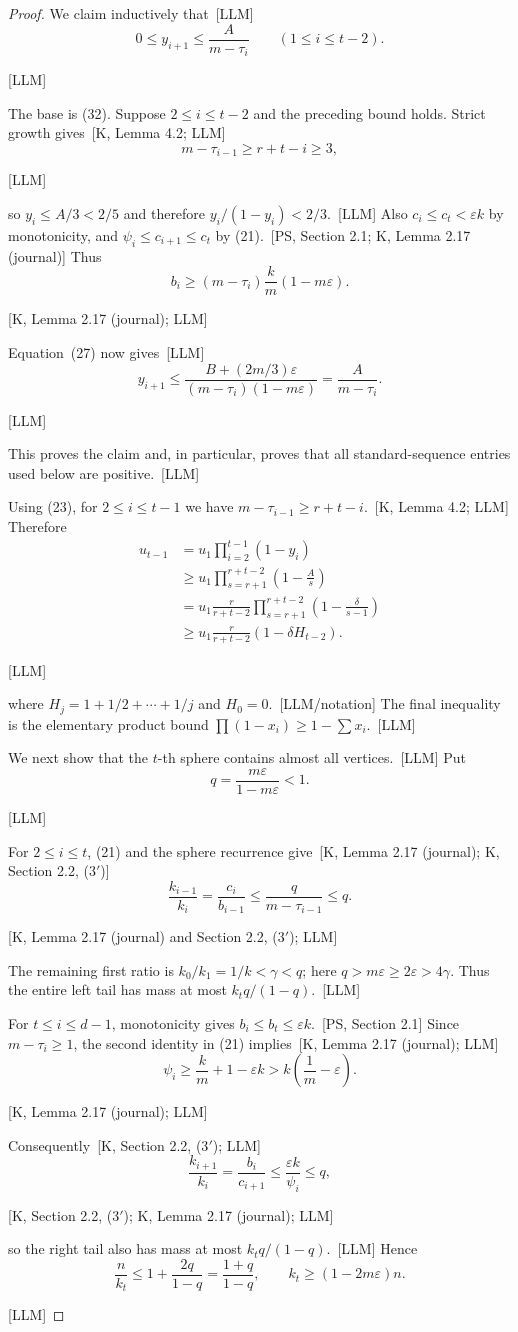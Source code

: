 \documentclass[10pt]{amsart}
\theoremstyle{remark}
\newcommand{\eps}{\varepsilon}
\newcommand{\prov}[1]{\unskip\, {\normalfont\scriptsize\color{provgray}\textsf{[#1]}}}
\newcommand{\eqprov}[1]{%
  \par\nobreak\vspace{-0.68\baselineskip}%
  \noindent\hfill{\normalfont\scriptsize\color{provgray}\textsf{[#1]}}%
  \par\vspace{0.20\baselineskip}%
}
\begin{document}
\begin{proof}
We claim inductively that\prov{LLM}
\begin{equation}
0\le y_{i+1}\le\frac{A}{m-\tau_i}
\qquad(1\le i\le t-2).
\end{equation}
\eqprov{LLM}
The base is (32). Suppose $2\le i\le t-2$ and the preceding bound holds. Strict growth gives\prov{K, Lemma 4.2; LLM}
\[
m-\tau_{i-1}\ge r+t-i\ge3,
\]
\eqprov{LLM}
so $y_i\le A/3<2/5$ and therefore $y_i/(1-y_i)<2/3$.\prov{LLM} Also $c_i\le c_t<\eps k$ by monotonicity, and $\psi_i\le c_{i+1}\le c_t$ by (21).\prov{PS, Section 2.1; K, Lemma 2.17 (journal)} Thus
\[
b_i\ge(m-\tau_i)\frac{k}{m}(1-m\eps).
\]
\eqprov{K, Lemma 2.17 (journal); LLM}
Equation~(27) now gives\prov{LLM}
\[
y_{i+1}\le\frac{B+(2m/3)\eps}{(m-\tau_i)(1-m\eps)}
=\frac{A}{m-\tau_i}.
\]
\eqprov{LLM}
This proves the claim and, in particular, proves that all standard-sequence entries used below are positive.\prov{LLM}

Using (23), for $2\le i\le t-1$ we have $m-\tau_{i-1}\ge r+t-i$.\prov{K, Lemma 4.2; LLM} Therefore
\begin{equation}
\begin{aligned}
u_{t-1}
&=u_1\prod_{i=2}^{t-1}(1-y_i)\\
&\ge u_1\prod_{s=r+1}^{r+t-2}\left(1-\frac{A}{s}\right)\\
&=u_1\frac{r}{r+t-2}\prod_{s=r+1}^{r+t-2}\left(1-\frac{\delta}{s-1}\right)\\
&\ge u_1\frac{r}{r+t-2}(1-\delta H_{t-2}).
\end{aligned}
\end{equation}
\eqprov{LLM}
where $H_j=1+1/2+\cdots+1/j$ and $H_0=0$.\prov{LLM/notation} The final inequality is the elementary product bound $\prod(1-x_i)\ge1-\sum x_i$.\prov{LLM}

We next show that the $t$-th sphere contains almost all vertices.\prov{LLM} Put
\begin{equation}
q=\frac{m\eps}{1-m\eps}<1.
\end{equation}
\eqprov{LLM}
For $2\le i\le t$, (21) and the sphere recurrence give\prov{K, Lemma 2.17 (journal); K, Section 2.2, (3\(\prime\))}
\[
\frac{k_{i-1}}{k_i}=\frac{c_i}{b_{i-1}}
\le\frac{q}{m-\tau_{i-1}}\le q.
\]
\eqprov{K, Lemma 2.17 (journal) and Section 2.2, (3\(\prime\)); LLM}
The remaining first ratio is $k_0/k_1=1/k<\gamma<q$; here $q>m\eps\ge2\eps>4\gamma$. Thus the entire left tail has mass at most $k_tq/(1-q)$.\prov{LLM}

For $t\le i\le d-1$, monotonicity gives $b_i\le b_t\le\eps k$.\prov{PS, Section 2.1} Since $m-\tau_i\ge1$, the second identity in (21) implies\prov{K, Lemma 2.17 (journal); LLM}
\[
\psi_i\ge\frac{k}{m}+1-\eps k>k\left(\frac1m-\eps\right).
\]
\eqprov{K, Lemma 2.17 (journal); LLM}
Consequently\prov{K, Section 2.2, (3\(\prime\)); LLM}
\[
\frac{k_{i+1}}{k_i}=\frac{b_i}{c_{i+1}}\le\frac{\eps k}{\psi_i}\le q,
\]
\eqprov{K, Section 2.2, (3\(\prime\)); K, Lemma 2.17 (journal); LLM}
so the right tail also has mass at most $k_tq/(1-q)$.\prov{LLM} Hence
\begin{equation}
\frac{n}{k_t}\le1+\frac{2q}{1-q}=\frac{1+q}{1-q},
\qquad
k_t\ge(1-2m\eps)n.
\end{equation}
\eqprov{LLM}


\end{proof}
\end{document}
